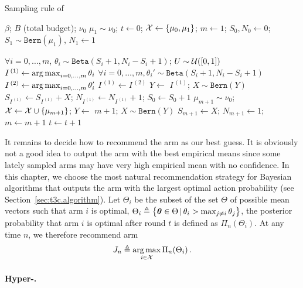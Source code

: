 \begin{algorithm}[ht]
\centering
\caption{Sampling rule of \DTTTS{}}
\label{alg:dttts}
\begin{algorithmic}[1] %
     $\beta$; $B$ (total budget); $\nu_0$
     $\mu_1 \sim \nu_0$; $t \gets 0$; $\mathcal{X} \gets \{\mu_0,\mu_1\}$; $m\gets1$; $S_0, N_0 \gets 0$; $S_1 \sim \texttt{Bern}(\mu_1)$, $N_1 \gets 1$\
    
	    \State $\forall i=0,\dots,m$, $\theta_i \sim \texttt{Beta}(S_i+1,N_i-S_i+1)$; $U \sim \mathcal{U}([0,1])$
	    \State $I^{\,(1)} \gets \operatorname*{arg\,max}_{i=0,\dots,m} \theta_i$
	            \State $\forall i=0,\dots,m, \theta_i' \sim \texttt{Beta}(S_i+1,N_i-S_i+1)$
	            \State $I^{\,(2)} \leftarrow \operatorname*{arg\,max}_{i=0,\dots,m}\theta_i'$ 
	        \EndWhile
	        \State $I^{\,(1)} \gets I^{\,(2)}$
	    \EndIf
	        \State $Y \leftarrow$  $I^{\,(1)}$; $X \sim \texttt{Bern}(Y)$ 
	        \State $S_{I^{\,(1)}} \gets S_{I^{\,(1)}} + X$; $N_{I^{\,(1)}} \gets N_{I^{\,(1)}} + 1$; $S_0 \gets S_0 + 1$
	    \Else
            \State $\mu_{m+1}\sim \nu_0$; $\mathcal{X} \gets \mathcal{X} \cup \{\mu_{m+1}\}$; 
            \State $Y \leftarrow$  $m+1$; $X \sim \texttt{Bern}(Y)$
           	\State $S_{m+1} \gets X$; $N_{m+1}
           	\gets 1$; $m \gets m + 1$
 	   \EndIf
  	   \State $t\gets t+1$
    \EndWhile
\end{algorithmic}
\end{algorithm}

It remains to decide how to recommend the arm as our best guess. It is obviously not a good idea to output the arm with the best empirical means since some lately sampled arms may have very high empirical mean with no confidence. In this chapter, we choose the most natural recommendation strategy for Bayesian algorithms that outputs the arm with the largest optimal action probability (see Section~\ref{sec:t3c.algorithm}). Let $\Theta_i$ be the subset of the set $\Theta$ of possible mean vectors such that arm $i$ is optimal, $\Theta_i \triangleq \big\{ {\boldsymbol \theta}\in\Theta \,|\, \theta_i > \max_{j\neq i}\theta_j \big\}$, the posterior probability that arm $i$ is optimal after round $t$ is defined as $\Pi_{n}(\Theta_i)$. At any time $n$, we therefore recommend  arm 
\[
    J_n \triangleq \operatorname*{arg\,max}_{i\in\mathcal{X}} \Pi_{n}(\Theta_i)\,.
\]

\paragraph{Hyper-\TTTS{}.}

